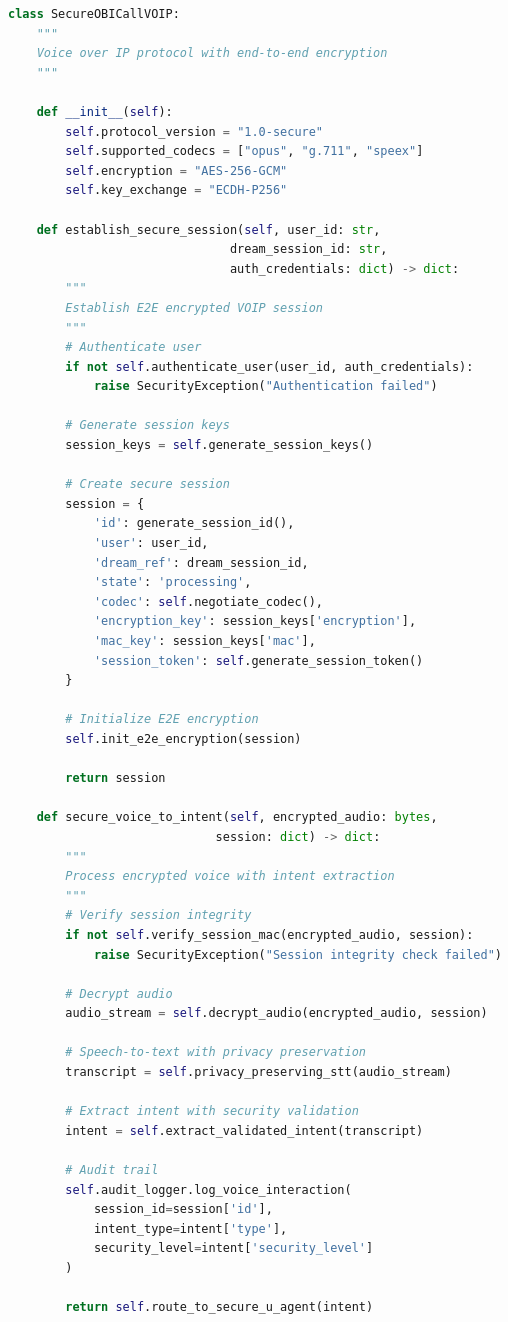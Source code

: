 \documentclass[12pt,a4paper]{article}
\begin{document}
\begin{lstlisting}[language=python, caption=Secure OBICall-VOIP Protocol]
class SecureOBICallVOIP:
    """
    Voice over IP protocol with end-to-end encryption
    """
    
    def __init__(self):
        self.protocol_version = "1.0-secure"
        self.supported_codecs = ["opus", "g.711", "speex"]
        self.encryption = "AES-256-GCM"
        self.key_exchange = "ECDH-P256"
        
    def establish_secure_session(self, user_id: str, 
                               dream_session_id: str,
                               auth_credentials: dict) -> dict:
        """
        Establish E2E encrypted VOIP session
        """
        # Authenticate user
        if not self.authenticate_user(user_id, auth_credentials):
            raise SecurityException("Authentication failed")
            
        # Generate session keys
        session_keys = self.generate_session_keys()
        
        # Create secure session
        session = {
            'id': generate_session_id(),
            'user': user_id,
            'dream_ref': dream_session_id,
            'state': 'processing',
            'codec': self.negotiate_codec(),
            'encryption_key': session_keys['encryption'],
            'mac_key': session_keys['mac'],
            'session_token': self.generate_session_token()
        }
        
        # Initialize E2E encryption
        self.init_e2e_encryption(session)
        
        return session
        
    def secure_voice_to_intent(self, encrypted_audio: bytes,
                             session: dict) -> dict:
        """
        Process encrypted voice with intent extraction
        """
        # Verify session integrity
        if not self.verify_session_mac(encrypted_audio, session):
            raise SecurityException("Session integrity check failed")
            
        # Decrypt audio
        audio_stream = self.decrypt_audio(encrypted_audio, session)
        
        # Speech-to-text with privacy preservation
        transcript = self.privacy_preserving_stt(audio_stream)
        
        # Extract intent with security validation
        intent = self.extract_validated_intent(transcript)
        
        # Audit trail
        self.audit_logger.log_voice_interaction(
            session_id=session['id'],
            intent_type=intent['type'],
            security_level=intent['security_level']
        )
        
        return self.route_to_secure_u_agent(intent)
\end{lstlisting}
\end{document}
